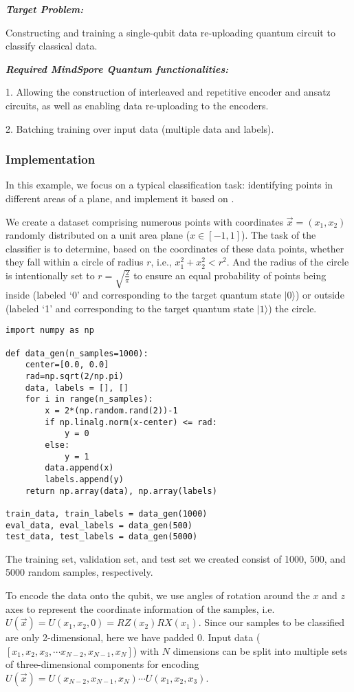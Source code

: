 \textbf{\textit{Target Problem:}}

Constructing and training a single-qubit data re-uploading quantum circuit to classify classical data.

\textbf{\textit{Required MindSpore Quantum functionalities:}}

1. Allowing the construction of interleaved and repetitive encoder and ansatz circuits, as well as enabling data re-uploading to the encoders.

2. Batching training over input data (multiple data and labels).

\subsubsection{Implementation}

In this example, we focus on a typical classification task: identifying points in different areas of a plane, and implement it based on \MindQuantum.

We create a dataset comprising numerous points with coordinates $\overrightarrow{x}=(x_1, x_2)$  randomly distributed on a unit area plane ($x\in[-1,1]$).
The task of the classifier is to determine, based on the coordinates of these data points, whether they fall within a circle of radius $r$, i.e., $x_1^2+x_2^2<r^2$.
And the radius of the circle is intentionally set to $r=\sqrt{\frac{2}{\pi}}$ to ensure an equal probability of points being inside (labeled `0' and corresponding to the target quantum state $|0\rangle$) or outside (labeled `1' and corresponding to the target quantum state $|1\rangle$) the circle.

\begin{lstlisting}
import numpy as np

def data_gen(n_samples=1000):
    center=[0.0, 0.0]
    rad=np.sqrt(2/np.pi)
    data, labels = [], []
    for i in range(n_samples):
        x = 2*(np.random.rand(2))-1
        if np.linalg.norm(x-center) <= rad:
            y = 0
        else:
            y = 1
        data.append(x)
        labels.append(y)
    return np.array(data), np.array(labels)

train_data, train_labels = data_gen(1000)
eval_data, eval_labels = data_gen(500)
test_data, test_labels = data_gen(5000)
\end{lstlisting}

The training set, validation set, and test set we created consist of 1000, 500, and 5000 random samples, respectively.

To encode the data onto the qubit, we use angles of rotation around the $x$ and $z$ axes to represent the coordinate information of the samples, i.e. $U(\overrightarrow{x})=U(x_1,x_2,0)=RZ(x_2)RX(x_1)$.  Since our samples to be classified are only 2-dimensional, here we have padded 0.
Input data ($[x_1, x_2, x_3, \cdots x_{N-2}, x_{N-1},x_{N}]$) with $N$ dimensions can be split into multiple sets of three-dimensional components for encoding $U(\overrightarrow{x})=U(x_{N-2},x_{N-1},x_{N})\cdots U(x_1,x_2,x_3)$.

